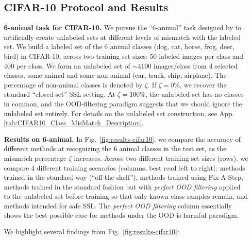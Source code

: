 \subsection{CIFAR-10 Protocol and Results}

\textbf{6-animal task for CIFAR-10.}
We pursue the ``6-animal'' task designed by \citet{oliverRealisticEvaluationDeep2018} to artificially create unlabeled sets at different levels of mismatch with the labeled set.
We build a labeled set of the 6 animal classes (dog, cat, horse, frog, deer, bird) in CIFAR-10, across two training set sizes: 50 labeled images per class and 400 per class.
We form an unlabeled set of ${\sim}4100$ images/class from 4 selected classes, some animal and some non-animal (car, truck, ship, airplane).
The percentage of non-animal classes is denoted by $\zeta$.
If $\zeta=0\%$, we recover the standard ``closed-set'' SSL setting.
At $\zeta=100\%$, the unlabeled set has no classes in common, and the OOD-filtering paradigm suggests that we should ignore the unlabeled set entirely.
For details on the unlabeled set construction, see App. \ref{tab:CIFAR10_Class_MisMatch_Description}.



\textbf{Results on 6-animal.}
In Fig.~\ref{fig:results-cifar10}, we compare the accuracy of different methods at recognizing the 6 animal classes in the test set, as the mismatch percentage $\zeta$ increases.
Across two different training set sizes (rows), we compare 4 different training scenarios (columns, best read left to right): methods trained in the standard way (``off-the-shelf''), methods trained using Fix-A-Step, methods trained in the standard fashion but with \emph{perfect OOD filtering} applied to the unlabeled set before training so that only known-class samples remain, and methods intended for safe SSL.
The \emph{perfect OOD filtering} column essentially shows the best-possible case for methods under the OOD-is-harmful paradigm.

We highlight several findings from Fig.~\ref{fig:results-cifar10}:

